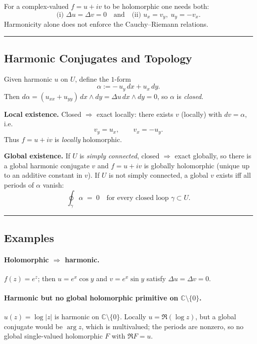 \documentclass[11pt]{article}
\begin{document}
For a complex-valued $f=u+iv$ to be holomorphic one needs both:
\[
\text{(i) } \Delta u=\Delta v=0 \quad \text{and} \quad
\text{(ii) } u_x=v_y,\; u_y=-v_x.
\]
Harmonicity alone does not enforce the Cauchy--Riemann relations.

\bigskip\hrule\bigskip

\subsection*{Harmonic Conjugates and Topology}

Given harmonic $u$ on $U$, define the $1$-form
\[
\alpha:=-\,u_y\,dx+u_x\,dy.
\]
Then $d\alpha=(u_{xx}+u_{yy})\,dx\wedge dy=\Delta u\,dx\wedge dy=0$, so $\alpha$ is \emph{closed}.

\medskip

\noindent\textbf{Local existence.}
Closed $\Rightarrow$ exact locally: there exists $v$ (locally) with $dv=\alpha$, i.e.
\[
v_y=u_x,\qquad v_x=-u_y.
\]
Thus $f=u+iv$ is \emph{locally} holomorphic.

\medskip

\noindent\textbf{Global existence.}
If $U$ is \emph{simply connected}, closed $\Rightarrow$ exact globally, so there is a global harmonic conjugate $v$ and $f=u+iv$ is globally holomorphic (unique up to an additive constant in $v$).
If $U$ is not simply connected, a global $v$ exists iff all periods of $\alpha$ vanish:
\[
\oint_\gamma \alpha \;=\; 0 \quad \text{for every closed loop }\gamma\subset U.
\]

\bigskip\hrule\bigskip

\subsection*{Examples}

\paragraph{Holomorphic $\Rightarrow$ harmonic.}
$f(z)=e^z$; then $u=e^x\cos y$ and $v=e^x\sin y$ satisfy $\Delta u=\Delta v=0$.

\medskip

\paragraph{Harmonic but no global holomorphic primitive on $\mathbb{C}\setminus\{0\}$.}
$u(z)=\log|z|$ is harmonic on $\mathbb{C}\setminus\{0\}$.
Locally $u=\Re(\log z)$, but a global conjugate would be $\arg z$, which is multivalued; the periods are nonzero, so no global single-valued holomorphic $F$ with $\Re F=u$.
\end{document}
